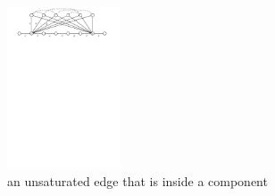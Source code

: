\documentclass[manuscript,screen=true, review, anonymous]{acmart}
\begin{document}
\begin{figure}[H]
	\centering
	\includegraphics[width=0.3\textwidth]{figs/substitute}
	\caption{an unsaturated edge that is inside a component}
\end{figure}
\end{document}
